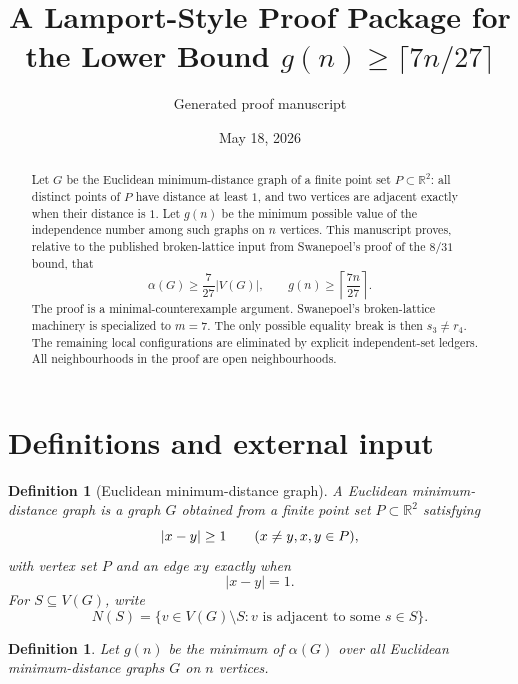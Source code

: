 \documentclass[11pt]{article}
\title{A Lamport-Style Proof Package for the Lower Bound $g(n)\ge \lceil 7n/27\rceil$}
\author{Generated proof manuscript}
\date{May 18, 2026}
\newtheorem{definition}[theorem]{Definition}
\newcommand{\RR}{\mathbb{R}}
\begin{document}
\maketitle

\begin{abstract}
Let $G$ be the Euclidean minimum-distance graph of a finite point set $P\subset\RR^2$: all distinct points of $P$ have distance at least $1$, and two vertices are adjacent exactly when their distance is $1$. Let $g(n)$ be the minimum possible value of the independence number among such graphs on $n$ vertices. This manuscript proves, relative to the published broken-lattice input from Swanepoel's proof of the $8/31$ bound, that
\[
  \alpha(G)\ge \frac{7}{27}|V(G)|,
  \qquad
  g(n)\ge \left\lceil \frac{7n}{27}\right\rceil .
\]
The proof is a minimal-counterexample argument. Swanepoel's broken-lattice machinery is specialized to $m=7$. The only possible equality break is then $s_3\ne r_4$. The remaining local configurations are eliminated by explicit independent-set ledgers. All neighbourhoods in the proof are open neighbourhoods.
\end{abstract}

\tableofcontents

\section{Definitions and external input}

\begin{definition}[Euclidean minimum-distance graph]
A Euclidean minimum-distance graph is a graph $G$ obtained from a finite point set $P\subset\RR^2$ satisfying
\[
 |x-y|\ge 1\qquad(x\ne y,\\ x,y\in P),
\]
with vertex set $P$ and an edge $xy$ exactly when
\[
 |x-y|=1.
\]
For $S\subseteq V(G)$, write
\[
N(S)=\{v\in V(G)\setminus S: v\text{ is adjacent to some }s\in S\}.
\]
\end{definition}

\begin{definition}
Let $g(n)$ be the minimum of $\alpha(G)$ over all Euclidean minimum-distance graphs $G$ on $n$ vertices.
\end{definition}
\end{document}
